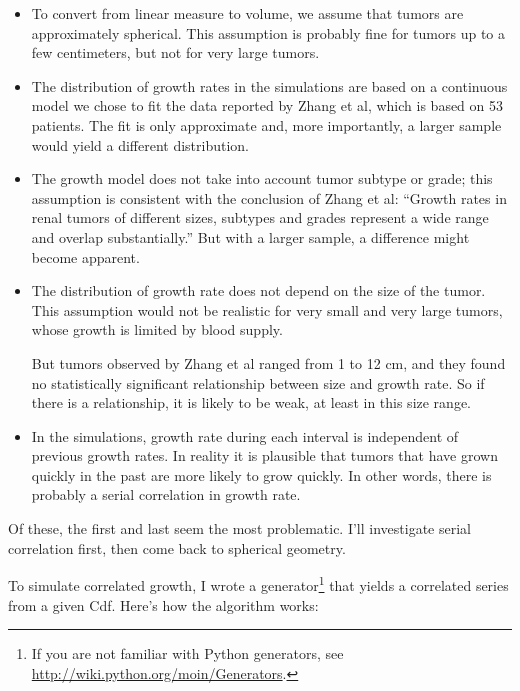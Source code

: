 \documentclass[12pt]{book}
\theoremstyle{exercise}
\begin{document}
\begin{itemize}

\item To convert from linear measure to volume, we assume that
  tumors are approximately spherical.  This assumption is probably
  fine for tumors up to a few centimeters, but not for very
  large tumors.

\item The distribution of growth rates in the simulations are based on
  a continuous model we chose to fit the data reported by Zhang et al,
  which is based on 53 patients.  The fit is only approximate and, more
  importantly, a larger sample would yield a
  different distribution.

\item The growth model does not take into account tumor subtype or
  grade; this assumption is consistent with the conclusion of Zhang et al:
  ``Growth rates in renal tumors of different sizes, subtypes and
  grades represent a wide range and overlap substantially.''
  But with a larger sample, a difference might become apparent.

\item The distribution of growth rate does not depend on the size of
  the tumor.  This assumption would not be realistic for very
  small and very large tumors, whose growth is limited by blood supply.

  But tumors observed by Zhang et al ranged from 1 to 12 cm, and they
  found no statistically significant relationship between
  size and growth rate.  So if there is a relationship, it is
  likely to be weak, at least in this size range.

\item In the simulations, growth rate during each interval is
  independent of previous growth rates.  In reality it is plausible
  that tumors that have grown quickly in the past are more likely
  to grow quickly.  In other words, there is probably
  a serial correlation in growth rate.

\end{itemize}

Of these, the first and last seem the most problematic.  I'll
investigate serial correlation first, then come back to
spherical geometry.

To simulate correlated growth, I wrote a generator\footnote{If you are
  not familiar with Python generators, see
  \url{http://wiki.python.org/moin/Generators}.} that yields a
correlated series from a given Cdf.  Here's how the algorithm works:
\end{document}
